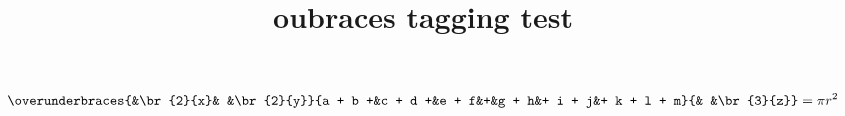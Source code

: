 \documentclass{article}
\title{oubraces tagging test}
\begin{document}
\[
 \overunderbraces{&\br{2}{x}& &\br{2}{y}}%
    {a + b +&c + d +&e + f&+&g + h&+ i + j&+ k + l + m}%
    {&  &\br{3}{z}}
  = \pi r^2
\]
\end{document}
